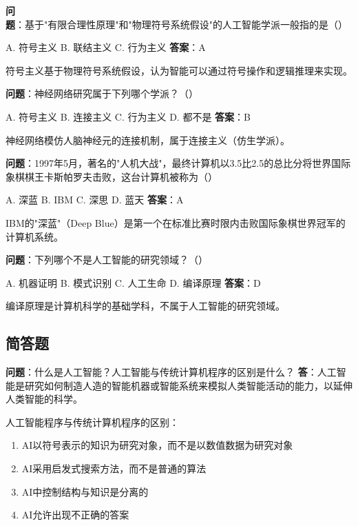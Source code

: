 \begin{examplebox}[选择题1.2]
\textbf{问题}：基于"有限合理性原理"和"物理符号系统假设"的人工智能学派一般指的是（\quad）

A. 符号主义 \quad B. 联结主义 \quad C. 行为主义
\tcblower
\textbf{答案}：A

符号主义基于物理符号系统假设，认为智能可以通过符号操作和逻辑推理来实现。
\end{examplebox}

\begin{examplebox}[选择题1.3]
\textbf{问题}：神经网络研究属于下列哪个学派？（\quad）

A. 符号主义 \quad B. 连接主义 \quad C. 行为主义 \quad D. 都不是
\tcblower
\textbf{答案}：B

神经网络模仿人脑神经元的连接机制，属于连接主义（仿生学派）。
\end{examplebox}

\begin{examplebox}[选择题1.4]
\textbf{问题}：1997年5月，著名的"人机大战"，最终计算机以3.5比2.5的总比分将世界国际象棋棋王卡斯帕罗夫击败，这台计算机被称为（\quad）

A. 深蓝 \quad B. IBM \quad C. 深思 \quad D. 蓝天
\tcblower
\textbf{答案}：A

IBM的"深蓝"（Deep Blue）是第一个在标准比赛时限内击败国际象棋世界冠军的计算机系统。
\end{examplebox}

\begin{examplebox}[选择题1.5]
\textbf{问题}：下列哪个不是人工智能的研究领域？（\quad）

A. 机器证明 \quad B. 模式识别 \quad C. 人工生命 \quad D. 编译原理
\tcblower
\textbf{答案}：D

编译原理是计算机科学的基础学科，不属于人工智能的研究领域。
\end{examplebox}

\subsection{简答题}

\begin{examplebox}[简答题1.1]
\textbf{问题}：什么是人工智能？人工智能与传统计算机程序的区别是什么？
\tcblower
\textbf{答}：人工智能是研究如何制造人造的智能机器或智能系统来模拟人类智能活动的能力，以延伸人类智能的科学。

人工智能程序与传统计算机程序的区别：
\begin{enumerate}[itemsep=0pt]
    \item AI以符号表示的知识为研究对象，而不是以数值数据为研究对象
    \item AI采用启发式搜索方法，而不是普通的算法
    \item AI中控制结构与知识是分离的
    \item AI允许出现不正确的答案
\end{enumerate}
\end{examplebox}

